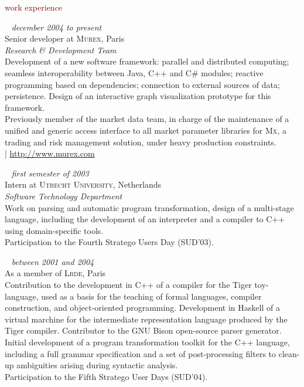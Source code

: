 \documentclass[a4paper, 10pt]{article}
\newcommand{\mysection}[1]{\fontspec{Hoefler Text}\fontsize{24pt}{0pt}\selectfont #1}%
\newcommand{\myurl}[1]{\fontspec{Gill Sans}\fontsize{10pt}{0pt}\selectfont #1}%
\begin{document}
  \begin{minipage}[t]{0.59\linewidth}
    {\textcolor{maroon}{\mysection work experience}}\\

    \par ~ \hfill \textcolor{medg}{\textit{december 2004 to present}}\\[5pt]
    {\large Senior developer at \textsc{Murex}, Paris\\
    \emph{\textcolor{darkg}{Research \& Development Team}}}\\[5pt]
    Development of a new software framework: parallel and distributed computing; seamless interoperability between Java, C++ and C\# modules; reactive programming based on dependencies; connection to external sources of data; persistence. Design of an interactive graph visualization prototype for this framework.\\[5pt]
    Previously member of the market data team, in charge of the maintenance of a unified and generic access interface to all market parameter libraries for \textsc{Mx}, a trading and risk management solution, under heavy production constraints.\\[5pt]
    {\textcolor{hyperlink}{\myurl | \url{http://www.murex.com}}}\\

    \par ~ \hfill \textcolor{medg}{\textit{first semester of 2003}}\\[5pt]
    {\large Intern at \textsc{Utrecht University}, Netherlands\\
    \emph{\textcolor{darkg}{Software Technology Department}}}\\[5pt]
    Work on parsing and automatic program transformation, design of a multi-stage language, including the development of an interpreter and a compiler to C++ using domain-specific tools.\\[5pt]
    Participation to the Fourth Stratego Users Day (SUD'03).\\

    \par ~ \hfill \textcolor{medg}{\textit{between 2001 and 2004}}\\[5pt]
    {\large As a member of \textsc{Lrde}, Paris}\\[5pt]
    Contribution to the development in C++ of a compiler for the Tiger toy-language, used as a basis for the teaching of formal languages, compiler construction, and object-oriented programming. Development in Haskell of a virtual marchine for the intermediate representation language produced by the Tiger compiler. Contributor to the GNU Bison open-source parser generator.\\[5pt]
    Initial development of a program transformation toolkit for the C++ language, including a full grammar specification and a set of post-processing filters to clean-up ambiguities arising during syntactic analysis.\\[5pt]
    Participation to the Fifth Stratego User Days (SUD'04).\\


\end{minipage}
\end{document}
